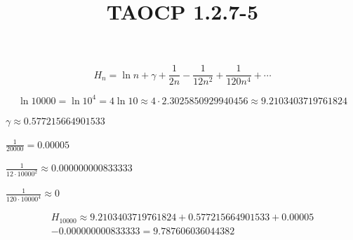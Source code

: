 \documentclass{article}
\title{TAOCP 1.2.7\mbox{-}5}
\begin{document}
\maketitle

\[ H_{n} = \ln{n} + \gamma + \frac{1}{2n} - \frac{1}{12n^{2}} + \frac{1}{120n^{4}} + \cdots \]

\[ \ln 10000 = \ln 10^{4} = 4 \ln{10} \approx 4 \cdot 2.3025850929940456 \approx 9.2103403719761824 \]

\( \gamma \approx 0.577215664901533 \)

\( \frac{1}{20000} = 0.00005 \)

\( \frac{1}{12 \cdot 10000^{2}} \approx 0.000000000833333 \)

\( \frac{1}{120 \cdot 10000^{4}} \approx 0 \)

\begin{multline*}
H_{10000} \approx 9.2103403719761824 + 0.577215664901533 + 0.00005 \\
- 0.000000000833333 = 9.787606036044382
\end{multline*}
\end{document}
